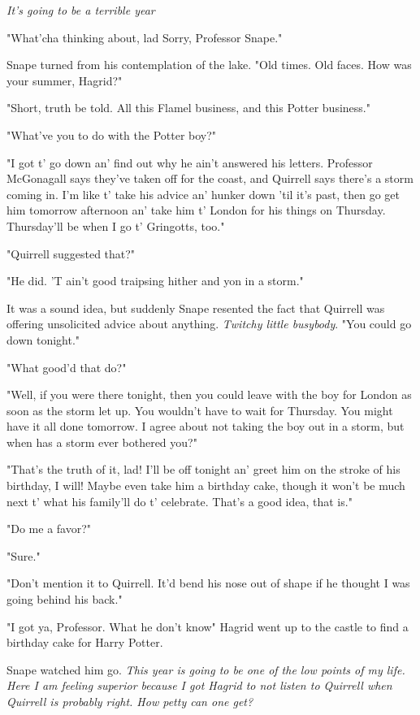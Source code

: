 \emph{It's going to be a terrible year{\el}}

"What'cha thinking about, lad{\el} Sorry, Professor Snape."

Snape turned from his contemplation of the lake. "Old times. Old faces. How was your summer, Hagrid?"

"Short, truth be told. All this Flamel business, and this Potter business."

"What've you to do with the Potter boy?"

"I got t' go down an' find out why he ain't answered his letters. Professor McGonagall says they've taken off for the coast, and Quirrell says there's a storm coming in. I'm like t' take his advice an' hunker down 'til it's past, then go get him tomorrow afternoon an' take him t' London for his things on Thursday. Thursday'll be when I go t' Gringotts, too."

"Quirrell suggested that?"

"He did. 'T ain't good traipsing hither and yon in a storm."

It was a sound idea, but suddenly Snape resented the fact that Quirrell was offering unsolicited advice about anything. \emph{Twitchy little busybody}. "You could go down tonight."

"What good'd that do?"

"Well, if you were there tonight, then you could leave with the boy for London as soon as the storm let up. You wouldn't have to wait for Thursday. You might have it all done tomorrow. I agree about not taking the boy out in a storm, but when has a storm ever bothered you?"

"That's the truth of it, lad! I'll be off tonight an' greet him on the stroke of his birthday, I will! Maybe even take him a birthday cake, though it won't be much next t' what his family'll do t' celebrate. That's a good idea, that is."

"Do me a favor?"

"Sure."

"Don't mention it to Quirrell. It'd bend his nose out of shape if he thought I was going behind his back."

"I got ya, Professor. What he don't know{\el}" Hagrid went up to the castle to find a birthday cake for Harry Potter.

Snape watched him go. \emph{This year is going to be one of the low points of my life. Here I am feeling superior because I got Hagrid to not listen to Quirrell when Quirrell is probably right. How petty can one get?}

